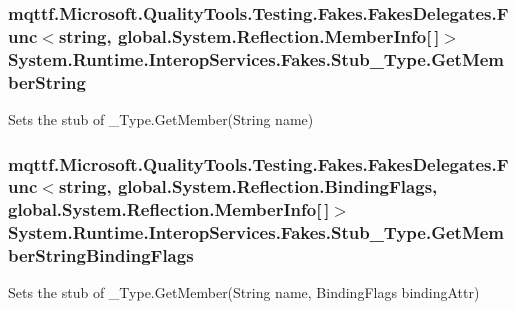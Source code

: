 \hypertarget{class_system_1_1_runtime_1_1_interop_services_1_1_fakes_1_1_stub___type_a790f8b87ca88385e3da33e19883bba72}{
\subsubsection[{Get\-Member\-String}]{\setlength{\rightskip}{0pt plus 5cm}mqttf.\-Microsoft.\-Quality\-Tools.\-Testing.\-Fakes.\-Fakes\-Delegates.\-Func$<$string, global.\-System.\-Reflection.\-Member\-Info\mbox{[}$\,$\mbox{]}$>$ System.\-Runtime.\-Interop\-Services.\-Fakes.\-Stub\-\_\-\-Type.\-Get\-Member\-String}}\label{class_system_1_1_runtime_1_1_interop_services_1_1_fakes_1_1_stub___type_a790f8b87ca88385e3da33e19883bba72}


Sets the stub of \-\_\-\-Type.\-Get\-Member(\-String name)

\hypertarget{class_system_1_1_runtime_1_1_interop_services_1_1_fakes_1_1_stub___type_a86f03b4cbd0ffbf00f373cf184fc3d43}{
\subsubsection[{Get\-Member\-String\-Binding\-Flags}]{\setlength{\rightskip}{0pt plus 5cm}mqttf.\-Microsoft.\-Quality\-Tools.\-Testing.\-Fakes.\-Fakes\-Delegates.\-Func$<$string, global.\-System.\-Reflection.\-Binding\-Flags, global.\-System.\-Reflection.\-Member\-Info\mbox{[}$\,$\mbox{]}$>$ System.\-Runtime.\-Interop\-Services.\-Fakes.\-Stub\-\_\-\-Type.\-Get\-Member\-String\-Binding\-Flags}}\label{class_system_1_1_runtime_1_1_interop_services_1_1_fakes_1_1_stub___type_a86f03b4cbd0ffbf00f373cf184fc3d43}


Sets the stub of \-\_\-\-Type.\-Get\-Member(\-String name, Binding\-Flags binding\-Attr)

